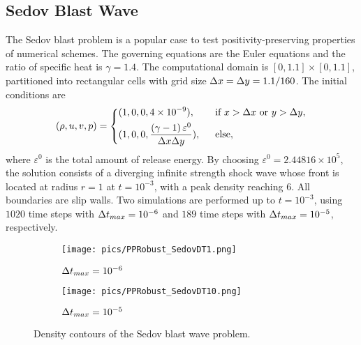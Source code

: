 \subsection{Sedov Blast Wave}

The Sedov blast problem \cite{zhang2012positivity,vilar2016positivity} is a popular case to test positivity-preserving properties of
numerical schemes.
The governing equations are the Euler equations and the ratio of specific heat is $\gamma = 1.4$. The computational domain is $[0,1.1]\times[0,1.1]$, partitioned into rectangular cells with grid size $\mathrm\Delta x = \mathrm\Delta y = 1.1/160$. The initial conditions are
\begin{equation}
    (\rho,u,v,p) = \begin{dcases}
        (1,0,0,4\times 10 ^{-9}),\ \                                          & \text{if } x > \inc x \ \mathrm{or} \ y > \inc y, \\
        (1,0,0,\dfrac{\left(\gamma-1\right)\varepsilon^0}{\inc x\inc y}),\ \  & \text{else},                                      \\
    \end{dcases}
\end{equation}
where $\varepsilon^0$ is the total amount of release energy. By choosing $\varepsilon^0= 2.44816\times 10^5$, the solution consists of a diverging infinite strength shock wave whose front is located at radius $r=1$ at $t=10^{-3}$, with a peak density reaching $6$.
All boundaries are slip walls.
Two simulations are performed up to $t=10^{-3}$, 
using $1020$ time steps with $\mathrm\Delta t_{max} = 10^{-6}$ 
and  $189$ time steps with $\mathrm\Delta t_{max} = 10^{-5}$, respectively.


\begin{figure}[htbp]
    \centering
    \begin{subfigure}{0.5\textwidth}
        \texttt{[image: pics/PPRobust\_SedovDT1.png]}
        \caption[]{$\mathrm\Delta t_{max}=10^{-6}$}
    \end{subfigure}\hfill
    \begin{subfigure}{0.5\textwidth}
        \texttt{[image: pics/PPRobust\_SedovDT10.png]}
        \caption[]{$\mathrm\Delta t_{max}=10^{-5}$}
    \end{subfigure}
    \caption{Density contours of the Sedov blast wave problem.}
    \label{fig:sedov}
\end{figure}

